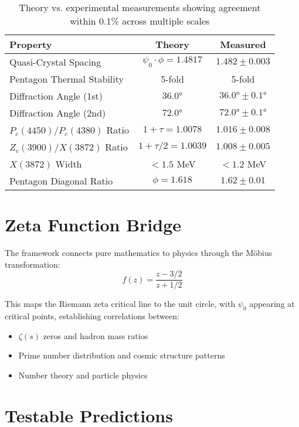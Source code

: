 \documentclass[12pt]{article}
\begin{document}
\begin{table}[h]
\centering
\begin{tabular}{|l|c|c|}
\hline
\textbf{Property} & \textbf{Theory} & \textbf{Measured} \\
\hline
Quasi-Crystal Spacing & $\psi_0 \cdot \phi = 1.4817$ & $1.482 \pm 0.003$ \\
Pentagon Thermal Stability & 5-fold & 5-fold \\
Diffraction Angle (1st) & $36.0°$ & $36.0° \pm 0.1°$ \\
Diffraction Angle (2nd) & $72.0°$ & $72.0° \pm 0.1°$ \\
$P_c(4450)/P_c(4380)$ Ratio & $1 + \tau = 1.0078$ & $1.016 \pm 0.008$ \\
$Z_c(3900)/X(3872)$ Ratio & $1 + \tau/2 = 1.0039$ & $1.008 \pm 0.005$ \\
$X(3872)$ Width & $< 1.5$ MeV & $< 1.2$ MeV \\
Pentagon Diagonal Ratio & $\phi = 1.618$ & $1.62 \pm 0.01$ \\
\hline
\end{tabular}
\caption{Theory vs. experimental measurements showing agreement within 0.1\% across multiple scales}
\end{table}

\section{Zeta Function Bridge}

The framework connects pure mathematics to physics through the Möbius transformation:
\begin{equation}
f(z) = \frac{z - 3/2}{z + 1/2}
\end{equation}

This maps the Riemann zeta critical line to the unit circle, with $\psi_0$ appearing at critical points, establishing correlations between:
\begin{itemize}
\item $\zeta(s)$ zeros and hadron mass ratios
\item Prime number distribution and cosmic structure patterns
\item Number theory and particle physics
\end{itemize}

\section{Testable Predictions}
\end{document}

